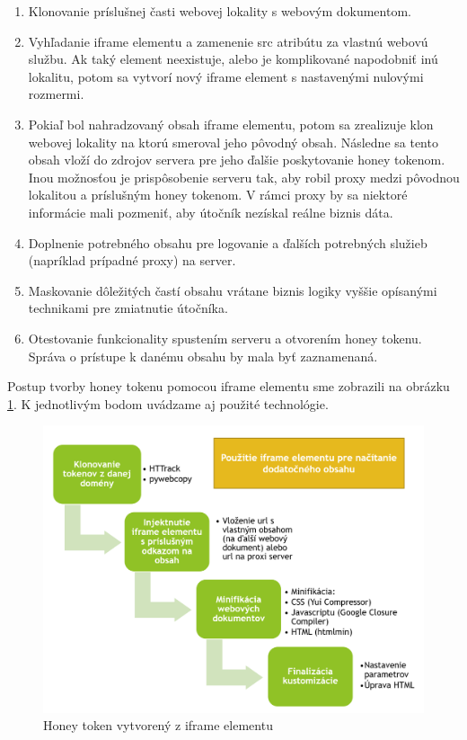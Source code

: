 \documentclass[conference, 11pt,slovak,a4paper,twoside]{IEEEtran}
\begin{document}
\begin{enumerate}
	\item Klonovanie príslušnej časti webovej lokality s webovým dokumentom.

	\item Vyhľadanie iframe elementu a zamenenie src atribútu za vlastnú webovú službu. Ak taký element neexistuje, alebo je komplikované napodobniť inú lokalitu, potom sa vytvorí nový iframe element s nastavenými nulovými rozmermi.
	
	\item Pokiaľ bol nahradzovaný obsah iframe elementu, potom sa zrealizuje klon webovej lokality na ktorú smeroval jeho pôvodný obsah. Následne sa tento obsah vloží do zdrojov servera pre jeho ďalšie poskytovanie honey tokenom. Inou možnosťou je prispôsobenie serveru tak, aby robil proxy medzi pôvodnou lokalitou a príslušným honey tokenom. V rámci proxy by sa niektoré informácie mali pozmeniť, aby útočník nezískal reálne biznis dáta.
	
	\item Doplnenie potrebného obsahu pre logovanie a ďalších potrebných služieb (napríklad prípadné proxy) na server.
	
	\item Maskovanie dôležitých častí obsahu vrátane biznis logiky vyššie opísanými technikami pre zmiatnutie útočníka.
	
	\item Otestovanie funkcionality spustením serveru a otvorením honey tokenu. Správa o prístupe k danému obsahu by mala byť zaznamenaná.
\end{enumerate}


Postup tvorby honey tokenu pomocou iframe elementu sme zobrazili na obrázku \ref{iframeToken}. K jednotlivým bodom uvádzame aj použité technológie.

\begin{figure}[!t]  %
					\begin{center}
									\includegraphics[width=\linewidth]{fig/iframeToken.png}
									\caption{Honey token vytvorený z iframe elementu}
									\label{iframeToken}
					\end{center}
\end{figure}
\end{document}
